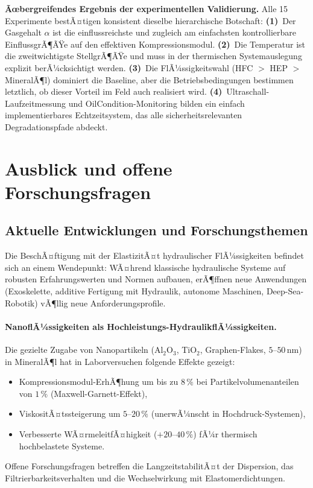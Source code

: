 ﻿\documentclass[a4paper,12pt]{scrreprt}
\theoremstyle{definition}
\begin{document}
\begin{infobox}
\textbf{Ãœbergreifendes Ergebnis der experimentellen Validierung.}
Alle 15 Experimente bestÃ¤tigen konsistent dieselbe hierarchische Botschaft:
\textbf{(1)}~Der Gasgehalt $\alpha$ ist die einflussreichste und zugleich
am einfachsten kontrollierbare EinflussgrÃ¶ÃŸe auf den effektiven
Kompressionsmodul.
\textbf{(2)}~Die Temperatur ist die zweitwichtigste StellgrÃ¶ÃŸe und muss in
der thermischen Systemauslegung explizit berÃ¼cksichtigt werden.
\textbf{(3)}~Die FlÃ¼ssigkeitswahl (HFC $>$ HEP $>$ MineralÃ¶l) dominiert die
Baseline, aber die Betriebsbedingungen bestimmen letztlich, ob dieser Vorteil
im Feld auch realisiert wird.
\textbf{(4)}~Ultraschall-Laufzeitmessung und OilCondition-Monitoring bilden
ein einfach implementierbares Echtzeitsystem, das alle sicherheitsrelevanten
Degradationspfade abdeckt.
\end{infobox}

\section{Ausblick und offene Forschungsfragen}

\subsection{Aktuelle Entwicklungen und Forschungsthemen}

Die BeschÃ¤ftigung mit der ElastizitÃ¤t hydraulischer FlÃ¼ssigkeiten befindet
sich an einem Wendepunkt: WÃ¤hrend klassische hydraulische Systeme auf
robusten Erfahrungswerten und Normen aufbauen, erÃ¶ffnen neue Anwendungen
(Exoskelette, additive Fertigung mit Hydraulik, autonome Maschinen, Deep-Sea-Robotik)
vÃ¶llig neue Anforderungsprofile.

\paragraph{NanoflÃ¼ssigkeiten als Hochleistungs-HydraulikflÃ¼ssigkeiten.}
Die gezielte Zugabe von Nanopartikeln (Al$_2$O$_3$, TiO$_2$, Graphen-Flakes,
$5$--$50\,\mathrm{nm}$) in MineralÃ¶l hat in Laborversuchen folgende
Effekte gezeigt:
\begin{itemize}
  \item Kompressionsmodul-ErhÃ¶hung um bis zu $8\,\%$ bei Partikelvolumen\-anteilen
    von $1\,\%$ (Maxwell-Garnett-Effekt),
  \item ViskositÃ¤tssteigerung um $5$--$20\,\%$ (unerwÃ¼nscht in Hochdruck-Systemen),
  \item Verbesserte WÃ¤rmeleitfÃ¤higkeit ($+20$--$40\,\%$) fÃ¼r thermisch
    hochbelastete Systeme.
\end{itemize}
Offene Forschungsfragen betreffen die LangzeitstabilitÃ¤t der Dispersion,
das Filtrierbarkeitsverhalten und die Wechselwirkung mit Elastomerdichtungen.
\end{document}
